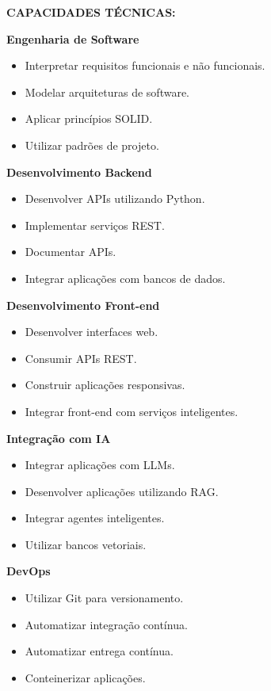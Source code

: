 \textbf{CAPACIDADES TÉCNICAS:}

\textbf{Engenharia de Software}

\begin{itemize}
\item Interpretar requisitos funcionais e não funcionais.
\item Modelar arquiteturas de software.
\item Aplicar princípios SOLID.
\item Utilizar padrões de projeto.
\end{itemize}

\textbf{Desenvolvimento Backend}

\begin{itemize}
\item Desenvolver APIs utilizando Python.
\item Implementar serviços REST.
\item Documentar APIs.
\item Integrar aplicações com bancos de dados.
\end{itemize}

\textbf{Desenvolvimento Front-end}

\begin{itemize}
\item Desenvolver interfaces web.
\item Consumir APIs REST.
\item Construir aplicações responsivas.
\item Integrar front-end com serviços inteligentes.
\end{itemize}

\textbf{Integração com IA}

\begin{itemize}
\item Integrar aplicações com LLMs.
\item Desenvolver aplicações utilizando RAG.
\item Integrar agentes inteligentes.
\item Utilizar bancos vetoriais.
\end{itemize}

\textbf{DevOps}

\begin{itemize}
\item Utilizar Git para versionamento.
\item Automatizar integração contínua.
\item Automatizar entrega contínua.
\item Conteinerizar aplicações.
\end{itemize}

